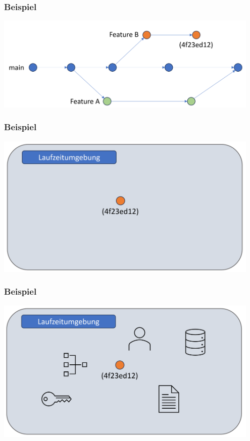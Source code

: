 \begin{frame}
	\frametitle{Beispiel}
	\begin{center}
	\includegraphics[width=0.95\textwidth]{img/git_history_01.png}
	\end{center}
\end{frame}

\begin{frame}
	\frametitle{Beispiel}
	\begin{center}
		\includegraphics[width=0.95\textwidth]{img/environment_1.png}
	\end{center}	
	
\end{frame}

\begin{frame}
	\frametitle{Beispiel}	
	\begin{center}
		\includegraphics[width=0.95\textwidth]{img/environment_2.png}
	\end{center}
	
\end{frame}


